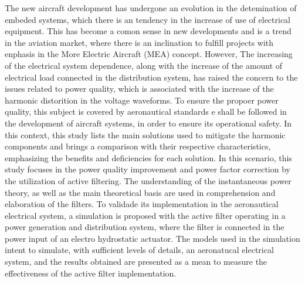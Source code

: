 The new aircraft development has undergone an evolution in the detemination of embeded systems, which there is an tendency in the increase of use of electrical equipment. This has become a comon sense in new developments and is a trend in the aviation market, where there is an inclination to fulfill projects with enphasis in the More Electric Aircraft (MEA) concept. However, The increasing of the electrical system dependence, along with the increase of the amount of electrical load connected in the distribution system, has raised the concern to the issues related to power quality, which is associated with the increase of the harmonic distorition in the voltage waveforms. To ensure the propoer power quality, this subject is covered by aeronautical standards e shall be followed in the development of aircraft systems, in order to ensure its operational safety. In this context, this study lists the main solutions used to mitigate the harmonic components and brings a comparison with their respective characteristics, emphasizing the benefits and deficiencies for each solution. In this scenario, this study focuses in the power quality improvement and power factor correction by the utilization of active filtering. The understanding of the instantaneous power theory, as well as the main theoretical basis are used in comprehension and elaboration of the filters. To validade its implementation in the aeronautical electrical system, a simulation is proposed with the active filter operating in a power generation and distribution system, where the filter is connected in the power input of an electro hydrostatic actuator. The models used in the simulation intent to simulate, with sufficient levels of details, an aeronatucal electrical system, and the results obtained are presented as a mean to measure the effectiveness of the active filter implementation.